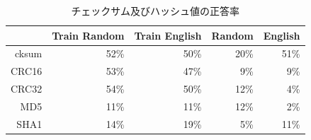 \documentclass[twocolumn, a4paper]{ieicejsp}
\begin{document}
\vspace{6mm}
\begin{table}[!h]
\begin{minipage}{0.9\linewidth}
 \begin{center}
 \centering
 \caption{チェックサム及びハッシュ値の正答率}
  \begin{footnotesize}
  \begin{tabular}{|r|r|r|r|r|}
  \hline
     & Train Random & Train English & Random & English    \\ \hline
  cksum   & 52\% & 50\% & 20\% & 51\%   \\ \hline
  CRC16   & 53\% & 47\% & 9\% & 9\%   \\ \hline
  CRC32   & 54\% & 50\% & 12\% & 4\%   \\ \hline
  MD5  & 11\% & 11\% & 12\%  & 2\%    \\ \hline
  SHA1    & 14\% & 19\% & 5\%  & 11\%    \\ \hline
  \end{tabular}\label{seitouritu}
  \end{footnotesize}
  \end{center}
  \end{minipage}
\end{table}


\end{document}
